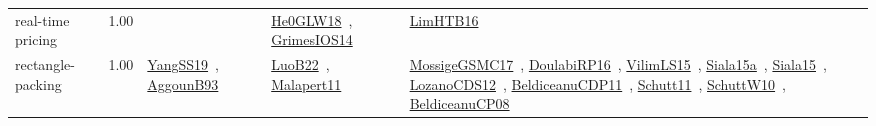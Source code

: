 {\begin{longtable}{p{3cm}r>{\raggedright\arraybackslash}p{6cm}>{\raggedright\arraybackslash}p{6cm}>{\raggedright\arraybackslash}p{8cm}}
\index{real-time pricing}\index{ApplicationAreas!real-time pricing}real-time pricing &  1.00 &  & \href{../works/He0GLW18.pdf}{He0GLW18}~\cite{He0GLW18}, \href{../works/GrimesIOS14.pdf}{GrimesIOS14}~\cite{GrimesIOS14} & \href{../works/LimHTB16.pdf}{LimHTB16}~\cite{LimHTB16}\\
\index{rectangle-packing}\index{ApplicationAreas!rectangle-packing}rectangle-packing &  1.00 & \href{../works/YangSS19.pdf}{YangSS19}~\cite{YangSS19}, \href{../works/AggounB93.pdf}{AggounB93}~\cite{AggounB93} & \href{../works/LuoB22.pdf}{LuoB22}~\cite{LuoB22}, \href{../works/Malapert11.pdf}{Malapert11}~\cite{Malapert11} & \href{../works/MossigeGSMC17.pdf}{MossigeGSMC17}~\cite{MossigeGSMC17}, \href{../works/DoulabiRP16.pdf}{DoulabiRP16}~\cite{DoulabiRP16}, \href{../works/VilimLS15.pdf}{VilimLS15}~\cite{VilimLS15}, \href{../works/Siala15a.pdf}{Siala15a}~\cite{Siala15a}, \href{../works/Siala15.pdf}{Siala15}~\cite{Siala15}, \href{../works/LozanoCDS12.pdf}{LozanoCDS12}~\cite{LozanoCDS12}, \href{../works/BeldiceanuCDP11.pdf}{BeldiceanuCDP11}~\cite{BeldiceanuCDP11}, \href{../works/Schutt11.pdf}{Schutt11}~\cite{Schutt11}, \href{../works/SchuttW10.pdf}{SchuttW10}~\cite{SchuttW10}, \href{../works/BeldiceanuCP08.pdf}{BeldiceanuCP08}~\cite{BeldiceanuCP08}\\

\end{longtable}}
